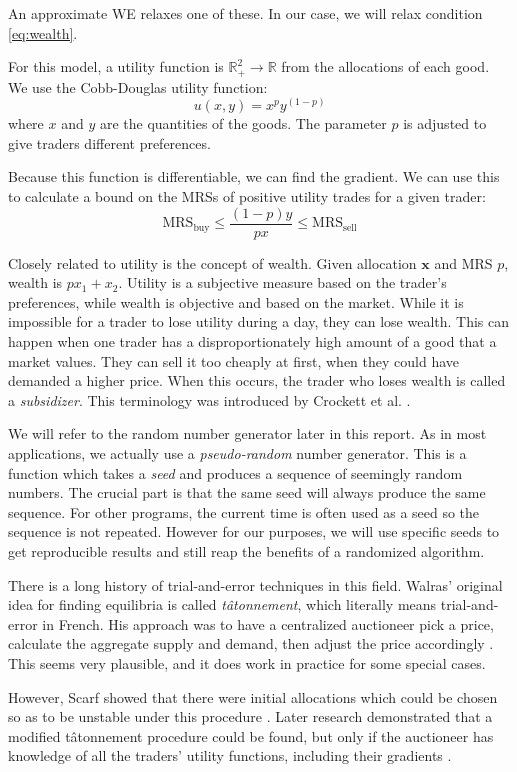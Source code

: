 \documentclass[12pt,a4paper,titlepage]{article}
\begin{document}
An approximate WE relaxes one of these.
In our case, we will relax condition \ref{eq:wealth}.

For this model, a utility function is $\mathbb{R}^2_+ \rightarrow \mathbb{R}$ from the allocations of each good.
We use the Cobb-Douglas utility function:
\[
  u(x, y) = x^p y^{(1-p)}
\]
where $x$ and $y$ are the quantities of the goods.
The parameter $p$ is adjusted to give traders different preferences.

Because this function is differentiable, we can find the gradient.
We can use this to calculate a bound on the MRSs of positive utility trades for a given trader:
\[
  \mathrm{MRS_{buy}} \leq \frac{(1-p)y}{px} \leq \mathrm{MRS_{sell}}
\]

Closely related to utility is the concept of wealth.
Given allocation $\mathbf{x}$ and MRS $p$, wealth is $ px_1 + x_2 $.
Utility is a subjective measure based on the trader's preferences, while wealth is objective and based on the market.
While it is impossible for a trader to lose utility during a day, they can lose wealth.
This can happen when one trader has a disproportionately high amount of a good that a market values.
They can sell it too cheaply at first, when they could have demanded a higher price.
When this occurs, the trader who loses wealth is called a \textit{subsidizer}.
This terminology was introduced by Crockett et al. \cite{crockett}.

We will refer to the random number generator later in this report.
As in most applications, we actually use a \textit{pseudo-random} number generator.
This is a function which takes a \textit{seed} and produces a sequence of seemingly random numbers.
The crucial part is that the same seed will always produce the same sequence.
For other programs, the current time is often used as a seed so the sequence is not repeated.
However for our purposes, we will use specific seeds to get reproducible results and still reap the benefits of a randomized algorithm.

There is a long history of trial-and-error techniques in this field.
Walras' original idea for finding equilibria is called \textit{tâtonnement}, which literally means trial-and-error in French.
His approach was to have a centralized auctioneer pick a price, calculate the aggregate supply and demand, then adjust the price accordingly \cite{walras}.
This seems very plausible, and it does work in practice for some special cases.

However, Scarf showed that there were initial allocations which could be chosen so as to be unstable under this procedure \cite{scarf}.
Later research demonstrated that a modified tâtonnement procedure could be found, but only if the auctioneer has knowledge of all the traders' utility functions, including their gradients \cite{smale}.
\end{document}
